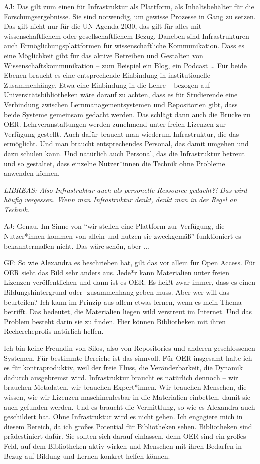 \documentclass[a4paper,
fontsize=11pt,
oneside,
numbers=noperiodatend,
parskip=half-,
bibliography=totoc,
final
]{scrartcl}
\begin{document}
AJ: Das gilt zum einen für Infrastruktur als Plattform, als
Inhaltsbehälter für die Forschungsergebnisse. Sie sind notwendig, um
gewisse Prozesse in Gang zu setzen. Das gilt nicht nur für die UN Agenda
2030, das gilt für alles mit wissenschaftlichem oder gesellschaftlichem
Bezug. Daneben sind Infrastrukturen auch Ermöglichungsplattformen für
wissenschaftliche Kommunikation. Dass es eine Möglichkeit gibt für das
aktive Betreiben und Gestalten von Wissenschaftskommunikation -- zum
Beispiel ein Blog, ein Podcast \ldots{} Für beide Ebenen braucht es eine
entsprechende Einbindung in institutionelle Zusammenhänge. Etwa eine
Einbindung in die Lehre -- bezogen auf Universitätsbibliotheken wäre
darauf zu achten, dass es für Studierende eine Verbindung zwischen
Lernmanagementsystemen und Repositorien gibt, dass beide Systeme
gemeinsam gedacht werden. Das schlägt dann auch die Brücke zu OER.
Lehrveranstaltungen werden zunehmend unter freien Lizenzen zur Verfügung
gestellt. Auch dafür braucht man wiederum Infrastruktur, die das
ermöglicht. Und man braucht entsprechendes Personal, das damit umgehen
und dazu schulen kann. Und natürlich auch Personal, das die
Infrastruktur betreut und so gestaltet, dass einzelne Nutzer*innen die
Technik ohne Probleme anwenden können.

\emph{LIBREAS: Also Infrastruktur auch als personelle Ressource
gedacht?! Das wird häufig vergessen. Wenn man Infrastruktur denkt, denkt
man in der Regel an Technik.}

AJ: Genau. Im Sinne von \enquote{wir stellen eine Plattform zur Verfügung, die
Nutzer*innen kommen von allein und nutzen sie zweckgemäß} funktioniert
es bekanntermaßen nicht. Das wäre schön, aber ...

GF: So wie Alexandra es beschrieben hat, gilt das vor allem für Open
Access. Für OER sieht das Bild sehr anders aus. Jede*r kann Materialien
unter freien Lizenzen veröffentlichen und dann ist es OER. Es heißt zwar
immer, dass es einen Bildungshintergrund oder -zusammenhang geben muss.
Aber wer will das beurteilen? Ich kann im Prinzip aus allem etwas
lernen, wenn es mein Thema betrifft. Das bedeutet, die Materialien
liegen wild verstreut im Internet. Und das Problem besteht darin sie zu
finden. Hier können Bibliotheken mit ihren Rechercheprofis natürlich
helfen.

Ich bin keine Freundin von Silos, also von Repositories und anderen
geschlossenen Systemen. Für bestimmte Bereiche ist das sinnvoll. Für OER
insgesamt halte ich es für kontraproduktiv, weil der freie Fluss, die
Veränderbarkeit, die Dynamik dadurch ausgebremst wird. Infrastruktur
braucht es natürlich dennoch -- wir brauchen Metadaten, wir brauchen
Expert*innen. Wir brauchen Menschen, die wissen, wie wir Lizenzen
maschinenlesbar in die Materialien einbetten, damit sie auch gefunden
werden. Und es braucht die Vermittlung, so wie es Alexandra auch
geschildert hat. Ohne Infrastruktur wird es nicht gehen. Ich engagiere
mich in diesem Bereich, da ich großes Potential für Bibliotheken sehen.
Bibliotheken sind prädestiniert dafür. Sie sollten sich darauf
einlassen, denn OER sind ein großes Feld, auf dem Bibliotheken aktiv
wirken und Menschen mit ihren Bedarfen in Bezug auf Bildung und Lernen
konkret helfen können.
\end{document}
